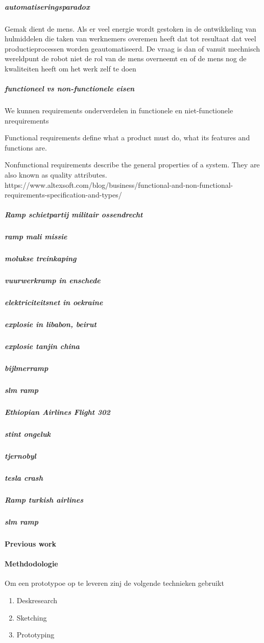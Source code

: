 \documentclass[11pt]{report} %
\begin{document}
\subparagraph{automatiseringsparadox }
Gemak dient de mens. Als er veel energie wordt gestoken in de ontwikkeling van hulmiddelen die taken van 
werknemers overemen heeft dat tot resultaat dat veel productieprocessen worden geautomatiseerd. De vraag is 
dan of vanuit mechnisch wereldpunt de robot niet de rol van de mens overneemt en of de mens nog de kwaliteiten 
heeft om het werk zelf te doen 

\subparagraph{functioneel vs non-functionele eisen }
 We kunnen requirements onderverdelen in functionele en niet-functionele nrequirements

Functional requirements define what a product must do, what its features and functions are.


Nonfunctional requirements describe the general properties of a system. They are also known as quality attributes.
https://www.altexsoft.com/blog/business/functional-and-non-functional-requirements-specification-and-types/

\subparagraph{Ramp schietpartij militair ossendrecht }
\subparagraph{ramp mali missie }
\subparagraph{molukse treinkaping }
\subparagraph{vuurwerkramp in enschede }
\subparagraph{elektriciteitsnet in oekraine }
\subparagraph{explosie in libabon, beirut }
\subparagraph{explosie tanjin china }
\subparagraph{bijlmerramp }
\subparagraph{slm ramp }
\subparagraph{Ethiopian Airlines Flight 302 }

\subparagraph{stint ongeluk }
\subparagraph{tjernobyl  }
\subparagraph{tesla crash  }
\subparagraph{Ramp turkish airlines  }
\subparagraph{slm ramp }



\paragraph{Previous work}





\paragraph{Methdodologie}

Om een prototypoe op te leveren zinj de volgende technieken gebruikt

 \begin{enumerate}
	\item Deskresearch
	\item Sketching
	\item Prototyping
\end{enumerate}
\end{document}
